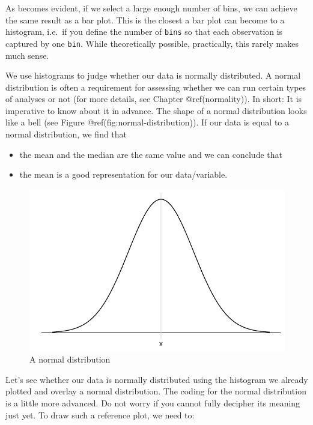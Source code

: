 \documentclass[
  letterpaper,
]{krantz}
\begin{document}
As becomes evident, if we select a large enough number of bins, we can
achieve the same result as a bar plot. This is the closest a bar plot
can become to a histogram, i.e.~if you define the number of
\texttt{bins} so that each observation is captured by one \texttt{bin}.
While theoretically possible, practically, this rarely makes much sense.

We use histograms to judge whether our data is normally distributed. A
normal distribution is often a requirement for assessing whether we can
run certain types of analyses or not (for more details, see Chapter
@ref(normality)). In short: It is imperative to know about it in
advance. The shape of a normal distribution looks like a bell (see
Figure @ref(fig:normal-distribution)). If our data is equal to a normal
distribution, we find that

\begin{itemize}
\item
  the mean and the median are the same value and we can conclude that
\item
  the mean is a good representation for our data/variable.
\end{itemize}

\begin{figure}[H]

{\centering \includegraphics{08_descriptive_statistics_files/figure-pdf/normal-distribution-1.pdf}

}

\caption{A normal distribution}

\end{figure}%

Let's see whether our data is normally distributed using the histogram
we already plotted and overlay a normal distribution. The coding for the
normal distribution is a little more advanced. Do not worry if you
cannot fully decipher its meaning just yet. To draw such a reference
plot, we need to:
\end{document}
